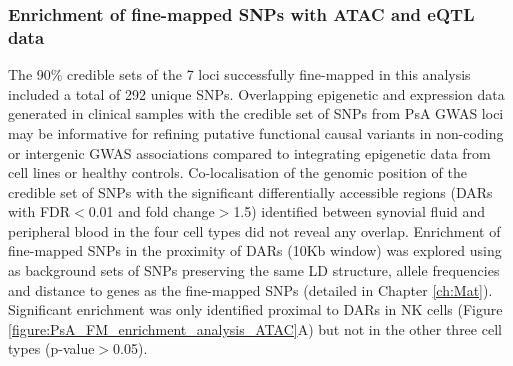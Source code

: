 \subsubsection{Enrichment of fine-mapped SNPs with ATAC and eQTL data}

The 90\% credible sets of the 7 loci successfully fine-mapped in this analysis included a total of 292 unique SNPs. Overlapping epigenetic and expression data generated in clinical samples with the credible set of SNPs from PsA GWAS loci may be informative for refining putative functional causal variants in non-coding or intergenic GWAS associations compared to integrating epigenetic data from cell lines or healthy controls. Co-localisation of the genomic position of the credible set of SNPs with the significant differentially accessible regions (DARs with FDR$<$0.01 and fold change$>$1.5) identified between synovial fluid and peripheral blood in the four cell types did not reveal any overlap. Enrichment of fine-mapped SNPs in the proximity of DARs (10Kb window) was explored using as background sets of SNPs preserving the same LD structure, allele frequencies and distance to genes as the fine-mapped SNPs (detailed in Chapter \ref{ch:Mat}). Significant enrichment was only identified proximal to DARs in NK cells (Figure \ref{figure:PsA_FM_enrichment_analysis_ATAC}A) but not in the other three cell types (p-value$>$0.05). 




